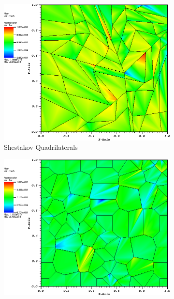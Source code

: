 \begin{figure}
{\begin{subfigure}[b]{0.465\textwidth}
	\end{subfigure}
}
{
	\vspace{3mm}
	\begin{subfigure}[b]{0.465\textwidth}
		\centering
		\label{subfig::shes_quad_me_k2_lin_sol}
		\includegraphics[width=\textwidth]{figures/sec_BF/quad_err_shesquad_PWL2.png}
		\caption{Shestakov Quadrilaterals}
	\end{subfigure}
	\hfill
	\begin{subfigure}[b]{0.465\textwidth}
		\centering
		\label{subfig::smooth_poly_me_k2_lin_sol}
		\includegraphics[width=\textwidth]{figures/sec_BF/quad_err_sinepoly_PWL2.png}

\end{subfigure}}
\end{figure}
